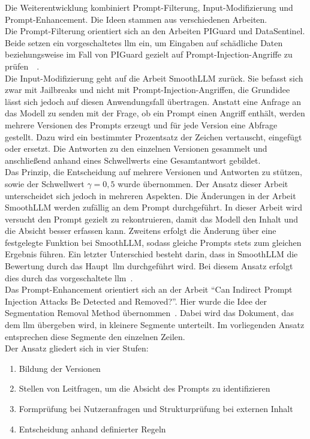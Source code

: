Die Weiterentwicklung kombiniert Prompt-Filterung, Input-Modifizierung und Prompt-Enhancement. Die Ideen stammen aus verschiedenen Arbeiten. \\
Die Prompt-Filterung orientiert sich an den Arbeiten PIGuard und DataSentinel. Beide setzen ein vorgeschaltetes \ac{llm} ein, um Eingaben auf schädliche
Daten beziehungsweise im Fall von PIGuard gezielt auf Prompt-Injection-Angriffe zu prüfen~\cite[30426]{sm37}~\cite[2194]{sm39}. \\
Die Input-Modifizierung geht auf die Arbeit SmoothLLM zurück. Sie befasst sich zwar mit Jailbreaks und nicht mit Prompt-Injection-Angriffen, die 
Grundidee lässt sich jedoch auf diesen Anwendungsfall übertragen. Anstatt eine Anfrage an das Modell zu senden mit der Frage, ob ein Prompt
einen Angriff enthält, werden mehrere Versionen des Prompts erzeugt und für jede Version eine Abfrage gestellt. Dazu wird ein bestimmter Prozentsatz der
Zeichen vertauscht, eingefügt oder ersetzt. Die Antworten zu den einzelnen Versionen gesammelt und anschließend anhand eines Schwellwerts eine Gesamtantwort
gebildet. \\
Das Prinzip, die Entscheidung auf mehrere Versionen und Antworten zu stützen, sowie der Schwellwert \(\gamma = 0{,}5\) wurde übernommen. Der Ansatz dieser Arbeit
unterscheidet sich jedoch in mehreren Aspekten. Die Änderungen in der Arbeit SmoothLLM werden zufällig an dem Prompt durchgeführt. In dieser Arbeit wird versucht den 
Prompt gezielt zu rekontruieren, damit das Modell den Inhalt und die Absicht besser erfassen kann. Zweitens erfolgt die Änderung über eine festgelegte Funktion
bei SmoothLLM,
sodass gleiche Prompts stets zum gleichen Ergebnis führen. Ein letzter Unterschied besteht darin, dass in SmoothLLM die Bewertung durch das Haupt~\ac{llm}
durchgeführt wird. Bei diesem Ansatz erfolgt dies durch das vorgeschaltete \ac{llm}~\cite{sm40}. \\
Das Prompt-Enhancement orientiert sich an der Arbeit \enquote{Can Indirect Prompt Injection Attacks Be Detected and Removed?}. Hier wurde die Idee der Segmentation
Removal Method übernommen~\cite[18193]{sm41}. Dabei wird das Dokument, das dem \ac{llm} übergeben wird, in kleinere Segmente unterteilt. Im vorliegenden Ansatz
entsprechen diese Segmente den einzelnen Zeilen. \\
Der Ansatz gliedert sich in vier Stufen:
\begin{enumerate}
    \item Bildung der Versionen
    \item Stellen von Leitfragen, um die Absicht des Prompts zu identifizieren
    \item Formprüfung bei Nutzeranfragen und Strukturprüfung bei externen Inhalt
    \item Entscheidung anhand definierter Regeln
\end{enumerate}
